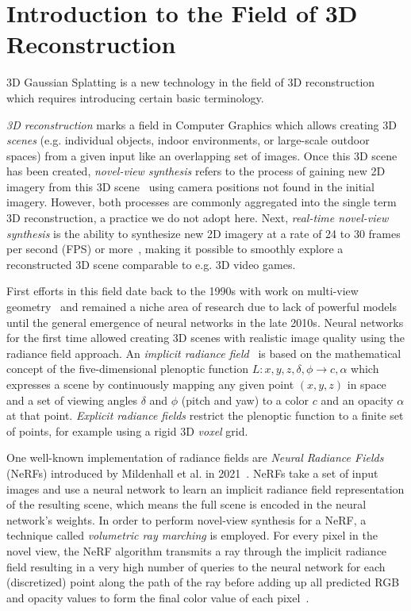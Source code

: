 \section{Introduction to the Field of 3D Reconstruction}
3D Gaussian Splatting is a new technology in the field of 3D reconstruction which requires introducing certain basic terminology.

\textit{3D reconstruction} marks a field in Computer Graphics which allows creating 3D \textit{scenes} (e.g. individual objects, indoor environments, or large-scale outdoor spaces) from a given input like an overlapping set of images.
Once this 3D scene has been created, \textit{novel-view synthesis} refers to the process of gaining new 2D imagery from this 3D scene~\cite{liuSurvey3DReconstruction2025, tewariStateArtNeural2020} using camera positions not found in the initial imagery. However, both processes are commonly aggregated into the single term 3D reconstruction, a practice we do not adopt here.
Next, \textit{real-time novel-view synthesis} is the ability to synthesize new 2D imagery at a rate of 24 to 30 frames per second (FPS) or more~\cite{heSurvey3DGaussian2026}, making it possible to smoothly explore a reconstructed 3D scene comparable to e.g. 3D video games.

First efforts in this field date back to the 1990s with work on multi-view geometry~\cite{liuSurvey3DReconstruction2025} and remained a niche area of research due to lack of powerful models until the general emergence of neural networks in the late 2010s. 
Neural networks for the first time allowed creating 3D scenes with realistic image quality using the radiance field approach.
An \textit{implicit radiance field}~\cite{hubertEditingImplicitExplicit2025a} is based on the mathematical concept of the five-dimensional plenoptic function $L: x, y, z, \delta, \phi \rightarrow c, \alpha$ which expresses a scene by continuously mapping any given point $(x, y, z)$ in space and a set of viewing angles $\delta$ and $\phi$ (pitch and yaw) to a color $c$ and an opacity $\alpha$ at that point.
\begingroup
{}
\textit{Explicit radiance fields} restrict the plenoptic function to a finite set of points, for example using a rigid 3D \textit{voxel} grid.
\par
\endgroup

One well-known implementation of radiance fields are \textit{Neural Radiance Fields} (NeRFs) introduced by Mildenhall et al. in 2021~\cite{mildenhallNeRFRepresentingScenes2020}. NeRFs take a set of input images and use a neural network to learn an implicit radiance field representation of the resulting scene, which means the full scene is encoded in the neural network's weights.
In order to perform novel-view synthesis for a NeRF, a technique called \textit{volumetric ray marching} is employed. 
For every pixel in the novel view, the NeRF algorithm transmits a ray through the implicit radiance field resulting in a very high number of queries to the neural network for each (discretized) point along the path of the ray before adding up all predicted RGB and opacity values to form the final color value of each pixel~\cite{mildenhallNeRFRepresentingScenes2020}.

